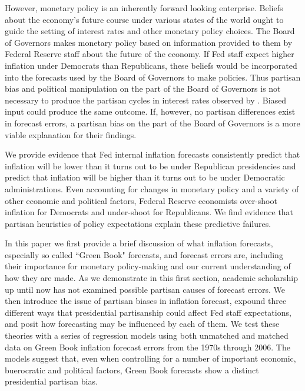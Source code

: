 \documentclass[a4paper]{article}
\begin{document}


However, monetary policy is an inherently forward looking enterprise. Beliefs about the economy's future course under various states of the world ought to guide the setting of interest rates and other monetary policy choices. The Board of Governors makes monetary policy based on information provided to them by Federal Reserve staff about the future of the economy. If Fed staff expect higher inflation under Democrats than Republicans, these beliefs would be incorporated into the forecasts used by the Board of Governors to make policies. Thus partisan bias and political manipulation on the part of the Board of Governors is not necessary to produce the partisan cycles in interest rates observed by \cite{Clark2012}. Biased input could produce the same outcome. If, however, no partisan differences exist in forecast errors, a partisan bias on the part of the Board of Governors is a more viable explanation for their findings.

We provide evidence that Fed internal inflation forecasts consistently predict that inflation will be lower than it turns out to be under Republican presidencies and predict that inflation will be higher than it turns out to be under Democratic administrations. Even accounting for changes in monetary policy and a variety of other economic and political factors, Federal Reserve economists over-shoot inflation for Democrats and under-shoot for Republicans. We find evidence that partisan heuristics of policy expectations explain these predictive failures.

In this paper we first provide a brief discussion of what inflation forecasts, especially so called ``Green Book" forecasts, and forecast errors are, including their importance for monetary policy-making and our current understanding of how they are made. As we demonstrate in this first section, academic scholarship up until now has not examined possible partisan causes of forecast errors. We then introduce the issue of partisan biases in inflation forecast, expound three different ways that presidential partisanship could affect Fed staff expectations, and posit how forecasting may be influenced by each of them. We test these theories with a series of regression models using both unmatched and matched data on Green Book inflation forecast errors from the 1970s through 2006. The models suggest that, even when controlling for a number of important economic, buerocratic and political factors, Green Book forecasts show a distinct presidential partisan bias. 
\end{document}
